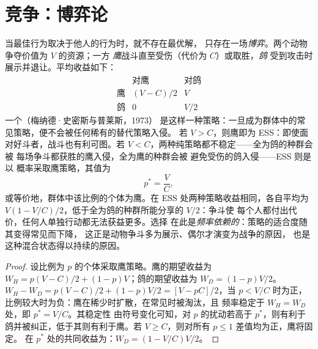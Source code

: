 \section{竞争：博弈论}

\begin{proposition}[鹰鸽博弈与演化稳定策略]\label{prop:b3:behavioural-ecology:hawk-dove}
当最佳行为取决于他人的行为时，就不存在最优解，
只存在一场\emph{博弈}。两个动物争夺价值为 $V$ 的资源；一方
\emph{鹰}战斗直至受伤（代价为 $C$）或取胜，\emph{鸽}
受到攻击时展示并退让。平均收益如下：
\[
\begin{array}{c|cc}
 & \text{对鹰} & \text{对鸽}\\ \hline
\text{鹰} & (V - C)/2 & V\\
\text{鸽} & 0 & V/2
\end{array}
\]
一个\emph{}（梅纳德·史密斯与普莱斯，1973）
是这样一种策略：一旦成为群体中的常见策略，便不会被任何稀有的替代策略入侵。
若 $V > C$，则鹰即为 ESS：即使面对好斗者，战斗也有利可图。若 $V
< C$，两种纯策略都不稳定——全为鸽的种群会被
每场争斗都获胜的鹰入侵，全为鹰的种群会被
避免受伤的鸽入侵——ESS 则是以
概率采取鹰策略，其值为
\[
p^{*} = \frac{V}{C},
\]
或等价地，群体中该比例的个体为鹰。在
ESS 处两种策略收益相同，各自平均为 $V(1 -
V/C)/2$，低于全为鸽的种群所能分享的 $V/2$：争斗使
每个人都付出代价，任何人单独行动都无法获益更多。选择
在此是\emph{频率依赖的}：策略的适合度随其变得常见而下降，
这正是动物争斗多为展示、偶尔才演变为战争的原因，
也是这种混合状态得以持续的原因。
\end{proposition}
\begin{proof}
设比例为 $p$ 的个体采取鹰策略。鹰的期望收益为 $W_{H} = p(V
- C)/2 + (1 - p)V$；鸽的期望收益为 $W_{D} = (1 - p)V/2$。$W_{H} - W_{D} =
p(V - C)/2 + (1 - p)V/2 = [V - pC]/2$，当 $p < V/C$ 时为正，
比例较大时为负：鹰在稀少时扩散，在常见时被淘汰，且
频率稳定于 $W_{H} = W_{D}$ 处，即 $p^{*} = V/C$。其稳定性
由符号变化可知，对 $p$ 的扰动若高于
$p^{*}$，则有利于鸽并被纠正，低于其则有利于鹰。若 $V
\ge C$，则对所有 $p \le 1$ 差值均为正，鹰将固定。
在 $p^{*}$ 处的共同收益为：$W_{D} = (1 - V/C)V/2$。
\end{proof}

